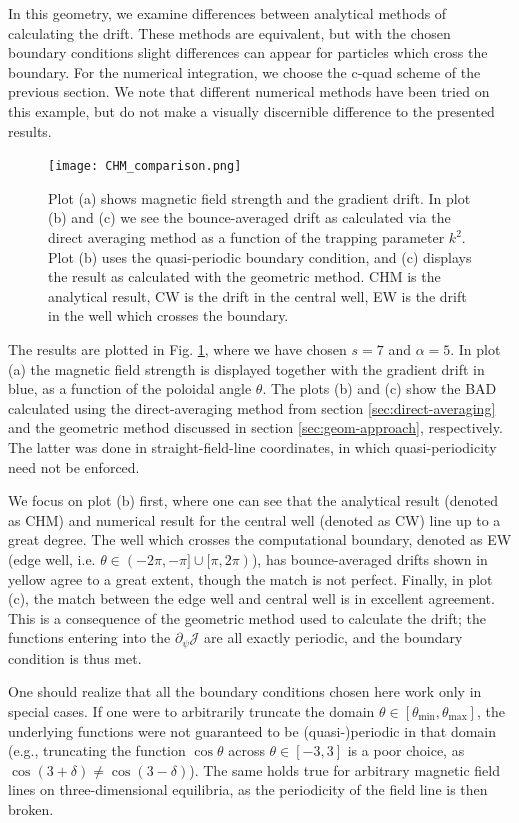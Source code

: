 In this geometry, we examine differences between analytical methods of calculating the drift. These methods are equivalent, but with the chosen boundary conditions slight differences can appear for particles which cross the boundary. For the numerical integration, we choose the c-quad scheme of the previous section. We note that different numerical methods have been tried on this example, but do not make a visually discernible difference to the presented results. \par 
\begin{figure}
    \centering
    \texttt{[image: CHM\_comparison.png]}
    \caption{Plot (a) shows magnetic field strength and the gradient drift. In plot (b) and (c) we see the bounce-averaged drift as calculated via the direct averaging method as a function of the trapping parameter $k^2$. Plot (b) uses the quasi-periodic boundary condition, and (c) displays the result as calculated with the geometric method. CHM is the analytical result, CW is the drift in the central well, EW is the drift in the well which crosses the boundary.}
    \label{fig:CHM-direct-averaging}
\end{figure}
The results are plotted in Fig. \ref{fig:CHM-direct-averaging}, where we have chosen $s=7$ and $\alpha = 5$. In plot (a) the magnetic field strength is displayed together with the gradient drift in blue, as a function of the poloidal angle $\theta$. The plots (b) and (c) show the BAD calculated using the direct-averaging method from section \ref{sec:direct-averaging} and the geometric method discussed in section \ref{sec:geom-approach}, respectively. The latter was done in straight-field-line coordinates, in which quasi-periodicity need not be enforced. \par 
We focus on plot (b) first, where one can see that the analytical result (denoted as CHM) and numerical result for the central well (denoted as CW) line up to a great degree. The well which crosses the computational boundary, denoted as EW (edge well, i.e. $\theta \in (-2\pi,-\pi] \cup [\pi,2\pi)$), has bounce-averaged drifts shown in yellow agree to a great extent, though the match is not perfect. Finally, in plot (c), the match between the edge well and central well is in excellent agreement. This is a consequence of the geometric method used to calculate the drift; the functions entering into the $\partial_\psi\mathcal{J}$ are all exactly periodic, and the boundary condition is thus met. \par 
One should realize that all the boundary conditions chosen here work only in special cases. If one were to arbitrarily truncate the domain $\theta \in \left[ \theta_\mathrm{min},\theta_\mathrm{max} \right]$, the underlying functions were not guaranteed to be (quasi-)periodic in that domain (e.g., truncating the function $\cos \theta$ across $\theta \in [-3,3]$ is a poor choice, as $\cos (3 + \delta) \neq \cos (3 - \delta )$). The same holds true for arbitrary magnetic field lines on three-dimensional equilibria, as the periodicity of the field line is then broken. 
